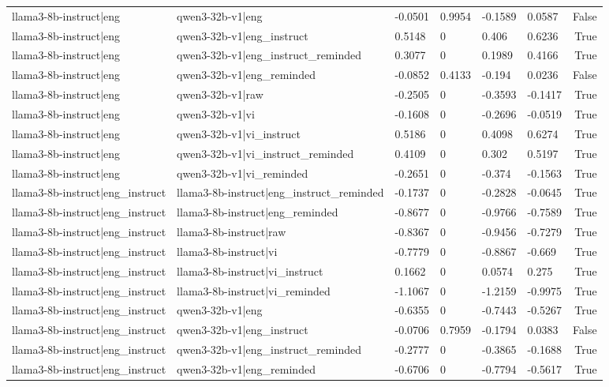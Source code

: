 \begin{table}
\begin{tabular}{llllllr}
llama3-8b-instruct|eng & qwen3-32b-v1|eng & -0.0501 & 0.9954 & -0.1589 & 0.0587 & False \\
llama3-8b-instruct|eng & qwen3-32b-v1|eng_instruct & 0.5148 & 0 & 0.406 & 0.6236 & True \\
llama3-8b-instruct|eng & qwen3-32b-v1|eng_instruct_reminded & 0.3077 & 0 & 0.1989 & 0.4166 & True \\
llama3-8b-instruct|eng & qwen3-32b-v1|eng_reminded & -0.0852 & 0.4133 & -0.194 & 0.0236 & False \\
llama3-8b-instruct|eng & qwen3-32b-v1|raw & -0.2505 & 0 & -0.3593 & -0.1417 & True \\
llama3-8b-instruct|eng & qwen3-32b-v1|vi & -0.1608 & 0 & -0.2696 & -0.0519 & True \\
llama3-8b-instruct|eng & qwen3-32b-v1|vi_instruct & 0.5186 & 0 & 0.4098 & 0.6274 & True \\
llama3-8b-instruct|eng & qwen3-32b-v1|vi_instruct_reminded & 0.4109 & 0 & 0.302 & 0.5197 & True \\
llama3-8b-instruct|eng & qwen3-32b-v1|vi_reminded & -0.2651 & 0 & -0.374 & -0.1563 & True \\
llama3-8b-instruct|eng_instruct & llama3-8b-instruct|eng_instruct_reminded & -0.1737 & 0 & -0.2828 & -0.0645 & True \\
llama3-8b-instruct|eng_instruct & llama3-8b-instruct|eng_reminded & -0.8677 & 0 & -0.9766 & -0.7589 & True \\
llama3-8b-instruct|eng_instruct & llama3-8b-instruct|raw & -0.8367 & 0 & -0.9456 & -0.7279 & True \\
llama3-8b-instruct|eng_instruct & llama3-8b-instruct|vi & -0.7779 & 0 & -0.8867 & -0.669 & True \\
llama3-8b-instruct|eng_instruct & llama3-8b-instruct|vi_instruct & 0.1662 & 0 & 0.0574 & 0.275 & True \\
llama3-8b-instruct|eng_instruct & llama3-8b-instruct|vi_reminded & -1.1067 & 0 & -1.2159 & -0.9975 & True \\
llama3-8b-instruct|eng_instruct & qwen3-32b-v1|eng & -0.6355 & 0 & -0.7443 & -0.5267 & True \\
llama3-8b-instruct|eng_instruct & qwen3-32b-v1|eng_instruct & -0.0706 & 0.7959 & -0.1794 & 0.0383 & False \\
llama3-8b-instruct|eng_instruct & qwen3-32b-v1|eng_instruct_reminded & -0.2777 & 0 & -0.3865 & -0.1688 & True \\
llama3-8b-instruct|eng_instruct & qwen3-32b-v1|eng_reminded & -0.6706 & 0 & -0.7794 & -0.5617 & True \\

\end{tabular}
\end{table}
